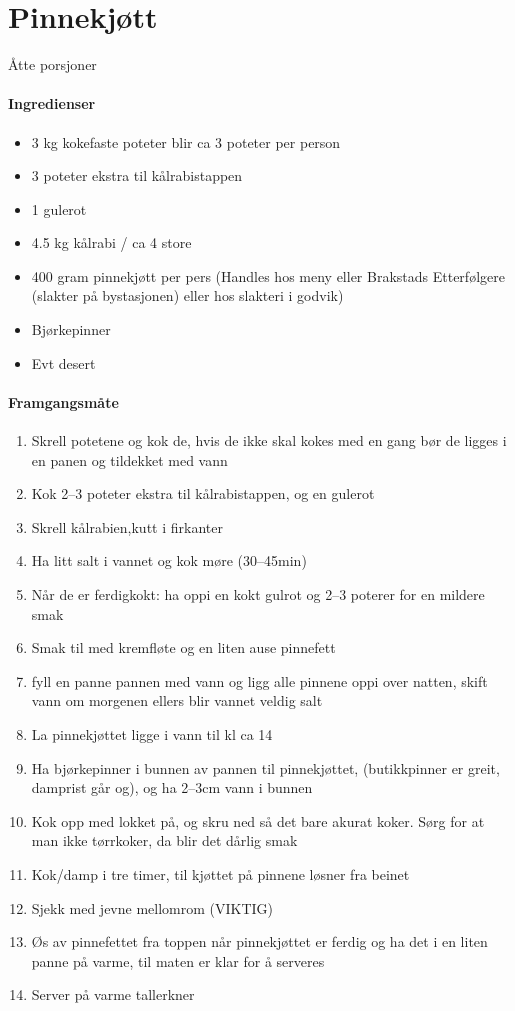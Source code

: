 \section{﻿Pinnekjøtt}
Åtte porsjoner

\paragraph{Ingredienser}
\begin{itemize}[noitemsep]
	\item 3 kg kokefaste poteter blir ca 3 poteter per person
	\item 3 poteter ekstra til kålrabistappen
	\item 1 gulerot
	\item 4.5 kg kålrabi / ca 4 store
	\item 400 gram pinnekjøtt per pers (Handles hos meny eller Brakstads Etterfølgere (slakter på bystasjonen) eller hos slakteri i godvik)
	\item Bjørkepinner
	\item Evt desert
\end{itemize}

\paragraph{Framgangsmåte}
\begin{enumerate}[noitemsep]
	\item Skrell potetene og kok de, hvis de ikke skal kokes med en gang bør de ligges i en panen og tildekket med vann
	\item Kok 2--3 poteter ekstra til kålrabistappen, og en gulerot
	\item Skrell kålrabien,kutt i firkanter
	\item Ha litt salt i vannet og kok møre (30--45min)
	\item Når de er ferdigkokt: ha oppi en kokt gulrot og 2--3 poterer for en mildere smak
	\item Smak til med kremfløte og en liten ause pinnefett
	\item fyll en panne pannen med vann og ligg alle pinnene oppi over natten, skift vann om morgenen ellers blir vannet veldig salt
	\item La pinnekjøttet ligge i vann  til kl ca 14
	\item Ha bjørkepinner i bunnen av pannen til pinnekjøttet, (butikkpinner er greit, damprist går og), og  ha 2--3cm vann i bunnen
	\item Kok opp med lokket på, og skru ned så det bare akurat koker. Sørg for at man ikke tørrkoker, da blir det dårlig smak
	\item Kok/damp i tre timer, til kjøttet på pinnene løsner fra beinet
	\item Sjekk med jevne mellomrom (VIKTIG)
	\item Øs av pinnefettet fra toppen når pinnekjøttet er ferdig og ha det i en liten panne på varme, til maten er klar for å serveres
	\item Server på varme tallerkner
\end{enumerate}


